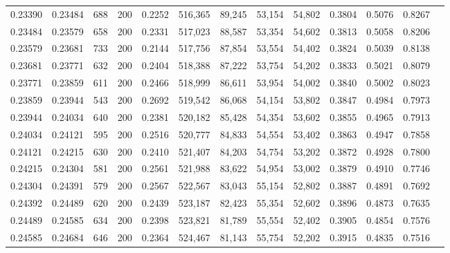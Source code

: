 \begin{tabular}{rrrrrrrrrrrrr}
0.23390 & 0.23484 &    688 & 200 &                                     0.2252 & 516,365 &  89,245 &  53,154 &  54,802 & 0.3804 & 0.5076 & 0.8267 \\
0.23484 & 0.23579 &    658 & 200 &                                     0.2331 & 517,023 &  88,587 &  53,354 &  54,602 & 0.3813 & 0.5058 & 0.8206 \\
0.23579 & 0.23681 &    733 & 200 &                                     0.2144 & 517,756 &  87,854 &  53,554 &  54,402 & 0.3824 & 0.5039 & 0.8138 \\
0.23681 & 0.23771 &    632 & 200 &                                     0.2404 & 518,388 &  87,222 &  53,754 &  54,202 & 0.3833 & 0.5021 & 0.8079 \\
0.23771 & 0.23859 &    611 & 200 &                                     0.2466 & 518,999 &  86,611 &  53,954 &  54,002 & 0.3840 & 0.5002 & 0.8023 \\
0.23859 & 0.23944 &    543 & 200 &                                     0.2692 & 519,542 &  86,068 &  54,154 &  53,802 & 0.3847 & 0.4984 & 0.7973 \\
0.23944 & 0.24034 &    640 & 200 &                                     0.2381 & 520,182 &  85,428 &  54,354 &  53,602 & 0.3855 & 0.4965 & 0.7913 \\
0.24034 & 0.24121 &    595 & 200 &                                     0.2516 & 520,777 &  84,833 &  54,554 &  53,402 & 0.3863 & 0.4947 & 0.7858 \\
0.24121 & 0.24215 &    630 & 200 &                                     0.2410 & 521,407 &  84,203 &  54,754 &  53,202 & 0.3872 & 0.4928 & 0.7800 \\
0.24215 & 0.24304 &    581 & 200 &                                     0.2561 & 521,988 &  83,622 &  54,954 &  53,002 & 0.3879 & 0.4910 & 0.7746 \\
0.24304 & 0.24391 &    579 & 200 &                                     0.2567 & 522,567 &  83,043 &  55,154 &  52,802 & 0.3887 & 0.4891 & 0.7692 \\
0.24392 & 0.24489 &    620 & 200 &                                     0.2439 & 523,187 &  82,423 &  55,354 &  52,602 & 0.3896 & 0.4873 & 0.7635 \\
0.24489 & 0.24585 &    634 & 200 &                                     0.2398 & 523,821 &  81,789 &  55,554 &  52,402 & 0.3905 & 0.4854 & 0.7576 \\
0.24585 & 0.24684 &    646 & 200 &                                     0.2364 & 524,467 &  81,143 &  55,754 &  52,202 & 0.3915 & 0.4835 & 0.7516 \\

\end{tabular}
